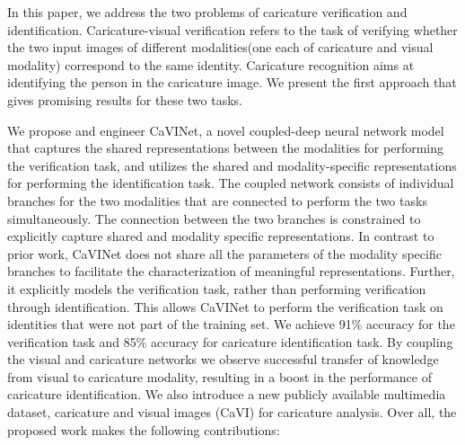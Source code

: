 In this paper, we address the two problems of caricature verification and identification. Caricature-visual verification refers to the task of verifying whether the two input images of different modalities(one each of caricature and visual modality) correspond to the same identity. Caricature recognition aims at identifying the person in the caricature image. We present the first approach that gives promising results for these two tasks. 

We propose and engineer CaVINet, a novel coupled-deep neural network model that captures the shared representations between the modalities for performing the verification task, and utilizes the shared and modality-specific representations for performing the identification task. The coupled network consists of individual branches for the two modalities that are connected to perform the two tasks simultaneously. The connection between the two branches is constrained to explicitly capture shared and modality specific representations. In contrast to prior work, CaVINet does not share all the parameters of the modality specific branches to facilitate the characterization of meaningful representations. Further, it explicitly models the verification task, rather than performing verification through identification. This allows CaVINet to perform the verification task on identities that were not part of the training set. We achieve 91\% accuracy for the verification task and 85\% accuracy for caricature identification task. By coupling the visual and caricature networks we observe successful transfer of knowledge from visual to caricature modality, resulting in a boost in the performance of caricature identification. We also introduce a new publicly available multimedia dataset, caricature and visual images (CaVI) for caricature analysis. Over all, the proposed work makes the following contributions:
